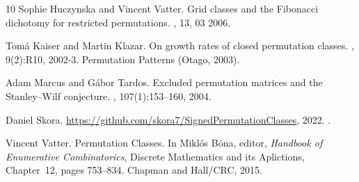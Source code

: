\documentclass{article}
\numberwithin{equation}{section}
\theoremstyle{definition}
\begin{document}
\begin{thebibliography}{10}
Sophie Huczynska and Vincent Vatter.
\newblock Grid classes and the {F}ibonacci dichotomy for restricted
  permutations.
, 13, 03 2006.

Tom\'{a} Kaiser and Martin Klazar.
\newblock On growth rates of closed permutation classes.
, 9(2):R10, 2002-3.
\newblock Permutation {P}atterns (Otago, 2003).

Adam Marcus and G\'abor Tardos.
\newblock Excluded permutation matrices and the {S}tanley--{W}ilf conjecture.
, 107(1):153--160,
  2004.

Daniel Skora.
\newblock \url{https://github.com/skora7/SignedPermutationClasses}, 2022.
.

Vincent Vatter.
\newblock Permutation {C}lasses.
\newblock In Mikl\'os B\'ona, editor, {\em Handbook of {E}numerative
  {C}ombinatorics}, Discrete {M}athematics and its {A}plictions, Chapter~12,
  pages 753--834. Chapman and Hall/CRC, 2015.

\end{thebibliography}
\end{document}
